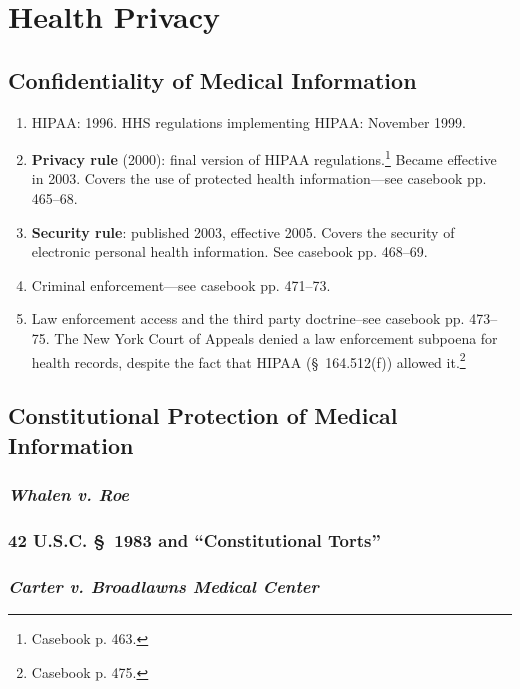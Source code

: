 \section{Health Privacy}

\subsection{Confidentiality of Medical Information}

\begin{enumerate}
    \item HIPAA: 1996. HHS regulations implementing HIPAA: November 1999.
    \item \textbf{Privacy rule} (2000): final version of HIPAA 
    regulations.\footnote{Casebook p. 463.} Became effective in 2003. Covers the 
    use of protected health information---see casebook pp. 465--68.
    \item \textbf{Security rule}: published 2003, effective 2005. Covers the 
    security of electronic personal health information. See casebook pp. 
    468--69.
    \item Criminal enforcement---see casebook pp. 471--73.
    \item Law enforcement access and the third party doctrine--see casebook pp. 
    473--75. The New York Court of Appeals denied a law enforcement subpoena for 
    health records, despite the fact that HIPAA (\S\ 164.512(f)) allowed 
    it.\footnote{Casebook p. 475.}
\end{enumerate}

\subsection{Constitutional Protection of Medical Information}

\subsubsection{\emph{Whalen v. Roe}}


\subsubsection{42 U.S.C. \S\ 1983 and ``Constitutional Torts''}


\subsubsection{\emph{Carter v. Broadlawns Medical Center}}

